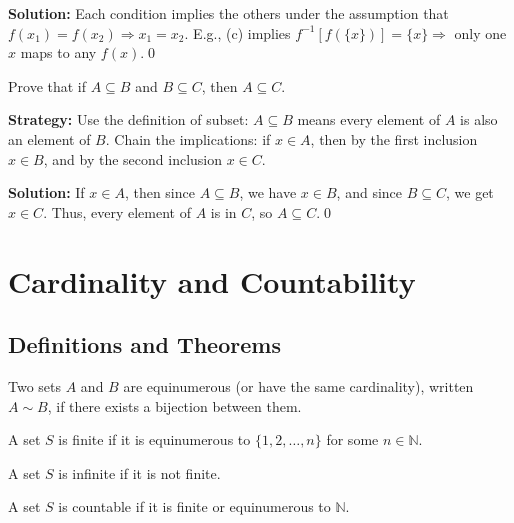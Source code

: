 \noindent\bigskip\noindent\textbf{Solution:}  
Each condition implies the others under the assumption that \( f(x_1) = f(x_2) \Rightarrow x_1 = x_2 \).  
E.g., (c) implies \( f^{-1}[f(\{x\})] = \{x\} \Rightarrow \) only one \( x \) maps to any \( f(x) \).\qed



\begin{problembox}
\begin{problemstatement}
Prove that if \( A \subseteq B \) and \( B \subseteq C \), then \( A \subseteq C \).
\end{problemstatement}
\end{problembox}

\noindent\textbf{Strategy:} Use the definition of subset: $A \subseteq B$ means every element of $A$ is also an element of $B$. Chain the implications: if $x \in A$, then by the first inclusion $x \in B$, and by the second inclusion $x \in C$.

\noindent\bigskip\noindent\textbf{Solution:}  
If \( x \in A \), then since \( A \subseteq B \), we have \( x \in B \), and since \( B \subseteq C \), we get \( x \in C \).  
Thus, every element of \( A \) is in \( C \), so \( A \subseteq C \).\qed

\section{Cardinality and Countability}

\subsection*{Definitions and Theorems}

\begin{definition}
Two sets $A$ and $B$ are equinumerous (or have the same cardinality), written $A \sim B$, if there exists a bijection between them.
\end{definition}

\begin{definition}
A set $S$ is finite if it is equinumerous to $\{1, 2, \ldots, n\}$ for some $n \in \mathbb{N}$.
\end{definition}

\begin{definition}
A set $S$ is infinite if it is not finite.
\end{definition}

\begin{definition}
A set $S$ is countable if it is finite or equinumerous to $\mathbb{N}$.
\end{definition}

